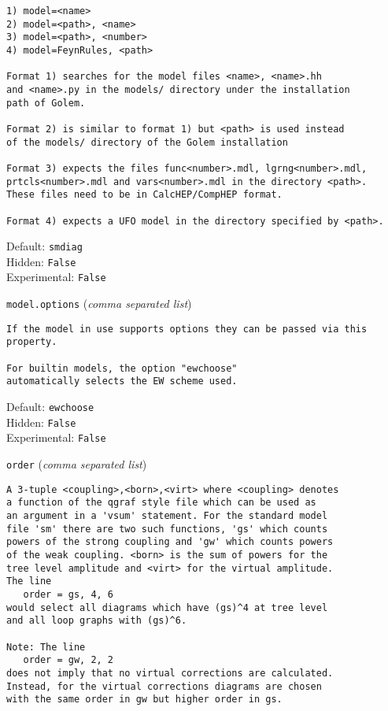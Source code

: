\begin{basedescript}{\desclabelstyle{\pushlabel}}
\begin{verbatim}
1) model=<name>
2) model=<path>, <name>
3) model=<path>, <number>
4) model=FeynRules, <path>

Format 1) searches for the model files <name>, <name>.hh
and <name>.py in the models/ directory under the installation
path of Golem.

Format 2) is similar to format 1) but <path> is used instead
of the models/ directory of the Golem installation

Format 3) expects the files func<number>.mdl, lgrng<number>.mdl,
prtcls<number>.mdl and vars<number>.mdl in the directory <path>.
These files need to be in CalcHEP/CompHEP format.

Format 4) expects a UFO model in the directory specified by <path>.
\end{verbatim}
Default: \verb|smdiag|
\\Hidden: \verb|False|
\\Experimental: \verb|False|
\\\item[\colorbox{gray!30}{\texttt{model.options}}] (\textit{comma separated list})
\begin{verbatim}
If the model in use supports options they can be passed via this
property.

For builtin models, the option "ewchoose"
automatically selects the EW scheme used.
\end{verbatim}
Default: \verb|ewchoose|
\\Hidden: \verb|False|
\\Experimental: \verb|False|
\\\item[\colorbox{gray!30}{\texttt{order}}] (\textit{comma separated list})
\begin{verbatim}
A 3-tuple <coupling>,<born>,<virt> where <coupling> denotes
a function of the qgraf style file which can be used as
an argument in a 'vsum' statement. For the standard model
file 'sm' there are two such functions, 'gs' which counts
powers of the strong coupling and 'gw' which counts powers
of the weak coupling. <born> is the sum of powers for the
tree level amplitude and <virt> for the virtual amplitude.
The line
   order = gs, 4, 6
would select all diagrams which have (gs)^4 at tree level
and all loop graphs with (gs)^6.

Note: The line
   order = gw, 2, 2
does not imply that no virtual corrections are calculated.
Instead, for the virtual corrections diagrams are chosen
with the same order in gw but higher order in gs.


\end{verbatim}
\end{basedescript}
